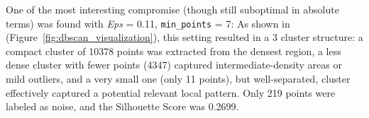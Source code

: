 One of the most interesting compromise (though still suboptimal in absolute terms) was found with \textit{Eps} = 0.11, \texttt{min\_points} = 7: 
As shown in (Figure~\ref{fig:dbscan_visualization}), this setting resulted in a 3 cluster structure: a compact cluster of 10378 points was extracted from the densest region, a less dense cluster with fewer points (4347) captured intermediate-density areas or mild outliers, 
and a very small one (only 11 points), but well-separated, cluster effectively captured a potential relevant local pattern. Only 219 points were labeled as noise, and the Silhouette Score was 0.2699.\\












